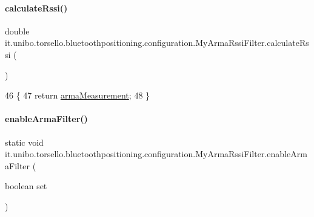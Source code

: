 \hypertarget{classit_1_1unibo_1_1torsello_1_1bluetoothpositioning_1_1configuration_1_1MyArmaRssiFilter_afcb40e796f16bc1352d34567e8984a87_afcb40e796f16bc1352d34567e8984a87}{}\label{classit_1_1unibo_1_1torsello_1_1bluetoothpositioning_1_1configuration_1_1MyArmaRssiFilter_afcb40e796f16bc1352d34567e8984a87_afcb40e796f16bc1352d34567e8984a87} 
\paragraph{\texorpdfstring{calculate\+Rssi()}{calculateRssi()}}
{\footnotesize\ttfamily double it.\+unibo.\+torsello.\+bluetoothpositioning.\+configuration.\+My\+Arma\+Rssi\+Filter.\+calculate\+Rssi (\begin{DoxyParamCaption}{ }\end{DoxyParamCaption})}


\begin{DoxyCode}
46                                   \{
47         \textcolor{keywordflow}{return} \hyperlink{classit_1_1unibo_1_1torsello_1_1bluetoothpositioning_1_1configuration_1_1MyArmaRssiFilter_a2be11d7395143321b8f2063afe14a8d0_a2be11d7395143321b8f2063afe14a8d0}{armaMeasurement};
48     \}
\end{DoxyCode}
\hypertarget{classit_1_1unibo_1_1torsello_1_1bluetoothpositioning_1_1configuration_1_1MyArmaRssiFilter_a0ce35b24ad6c6d9abe69e038b3e8da7d_a0ce35b24ad6c6d9abe69e038b3e8da7d}{}\label{classit_1_1unibo_1_1torsello_1_1bluetoothpositioning_1_1configuration_1_1MyArmaRssiFilter_a0ce35b24ad6c6d9abe69e038b3e8da7d_a0ce35b24ad6c6d9abe69e038b3e8da7d} 
\paragraph{\texorpdfstring{enable\+Arma\+Filter()}{enableArmaFilter()}}
{\footnotesize\ttfamily static void it.\+unibo.\+torsello.\+bluetoothpositioning.\+configuration.\+My\+Arma\+Rssi\+Filter.\+enable\+Arma\+Filter (\begin{DoxyParamCaption}\item[{boolean}]{set }\end{DoxyParamCaption})\hspace{0.3cm}{\ttfamily [static]}}


